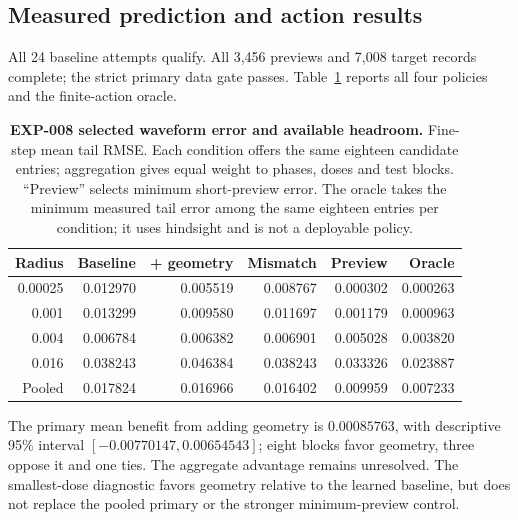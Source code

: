 \subsection{Measured prediction and action results}
All 24 baseline attempts qualify. All 3,456 previews and 7,008 target records complete; the strict primary data gate passes. Table~\ref{tab:information-dose} reports all four policies and the finite-action oracle.

\begin{table}[H]
\centering\small
\begin{tabular}{rrrrrr}
\toprule
Radius & Baseline & + geometry & Mismatch & Preview & Oracle \\
\midrule
0.00025 & 0.012970 & 0.005519 & 0.008767 & 0.000302 & 0.000263 \\
0.001 & 0.013299 & 0.009580 & 0.011697 & 0.001179 & 0.000963 \\
0.004 & 0.006784 & 0.006382 & 0.006901 & 0.005028 & 0.003820 \\
0.016 & 0.038243 & 0.046384 & 0.038243 & 0.033326 & 0.023887 \\
Pooled & 0.017824 & 0.016966 & 0.016402 & 0.009959 & 0.007233 \\
\bottomrule
\end{tabular}
\caption{\textbf{EXP-008 selected waveform error and available headroom.} Fine-step mean tail RMSE. Each condition offers the same eighteen candidate entries; aggregation gives equal weight to phases, doses and test blocks. ``Preview'' selects minimum short-preview error. The oracle takes the minimum measured tail error among the same eighteen entries per condition; it uses hindsight and is not a deployable policy.}
\label{tab:information-dose}
\end{table}
The primary mean benefit from adding geometry is $0.00085763$, with descriptive 95\% interval $[-0.00770147,0.00654543]$; eight blocks favor geometry, three oppose it and one ties. The aggregate advantage remains unresolved. The smallest-dose diagnostic favors geometry relative to the learned baseline, but does not replace the pooled primary or the stronger minimum-preview control.

